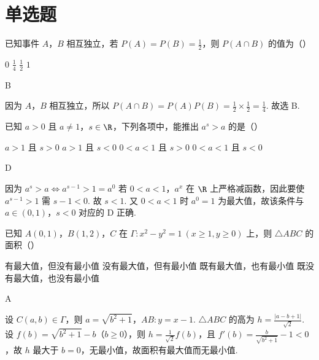 \section{单选题}

\begin{problem}
已知事件 \(A\)，\(B\) 相互独立，若 \(P(A)=P(B)=\frac{1}{2}\)，则 \(P(A\cap B)\) 的值为（\quad）

\choices
    {\(0\)}
    {\(\frac{1}{4}\)}
    {\(\frac{1}{2}\)}
    {\(1\)}
\end{problem}

\begin{answer}
B
\end{answer}

\begin{solution}
因为 \(A\)，\(B\) 相互独立，所以 \(P(A\cap B)=P(A)P(B)=\frac{1}{2}\times\frac{1}{2}=\frac{1}{4}\). 故选 B.
\end{solution}

\begin{problem}
已知 \(a>0\) 且 \(a\ne1\)，\(s\in\R\)，下列各项中，能推出 \(a^s>a\) 的是（\quad）

\choices
    {\(a>1\) 且 \(s>0\)}
    {\(a>1\) 且 \(s<0\)}
    {\(0<a<1\) 且 \(s>0\)}
    {\(0<a<1\) 且 \(s<0\)}
\end{problem}

\begin{answer}
D
\end{answer}

\begin{solution}
因为
\(
a^s>a\iff a^{s-1}>1=a^0
\)
若 \(0<a<1\)，\(a^x\) 在 \(\R\) 上严格减函数，因此要使 \(a^{s-1}>1\) 需 \(s-1<0\). 故 \(s<1\). 又 \(0<a<1\) 时 \(a^0=1\) 为最大值，故该条件与 \(a\in(0,1)\)，\(s<0\) 对应的 D 正确.
\end{solution}

\begin{problem}
已知 \(A(0,1)\)，\(B(1,2)\)，\(C\) 在 \(\Gamma:x^2-y^2=1\ (x\ge1,y\ge0)\) 上，则 \(\triangle ABC\) 的面积（\quad）

\choices
    {有最大值，但没有最小值}
    {没有最大值，但有最小值}
    {既有最大值，也有最小值}
    {既没有最大值，也没有最小值}
\end{problem}

\begin{answer}
A
\end{answer}

\begin{solution}
设 \(C(a,b)\in\Gamma\)，则 \(a=\sqrt{b^2+1}\)，\(AB: y=x-1\). \(\triangle ABC\) 的高为 \(h=\frac{|a-b+1|}{\sqrt2}\).
设 \(f(b)=\sqrt{b^2+1}-b\)（\(b\ge0\)），则 \(h=\frac{1}{\sqrt2}f(b)\)，且 \(f'(b)=\frac{b}{\sqrt{b^2+1}}-1<0\)，故 \(h\) 最大于 \(b=0\)，无最小值，故面积有最大值而无最小值.
\end{solution}

